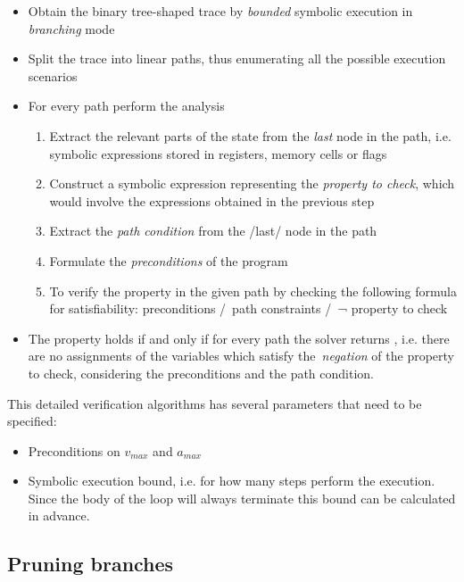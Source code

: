 \begin{itemize}
  \item Obtain the binary tree-shaped trace by \emph{bounded} symbolic execution
  in \emph{branching} mode
  \item Split the trace into linear paths, thus enumerating all the possible
    execution scenarios
  \item For every path perform the analysis
    \begin{enumerate}
      \item Extract the relevant parts of the state from the \emph{last} node in
            the path, i.e. symbolic expressions stored in
            registers, memory cells or flags
      \item Construct a symbolic expression representing the \emph{property to check},
            which would involve the expressions obtained in the previous step
      \item Extract the \emph{path condition} from the /last/ node in the path
      \item Formulate the \emph{preconditions} of the program
      \item To verify the property in the given path by checking the following
            formula for satisfiability:
              preconditions /\ path constraints /\ ¬ property to check
    \end{enumerate}
    \item  The property holds if and only if for every path the solver returns
           , i.e. there are no assignments of the variables which
           satisfy the~\emph{negation} of the property to check, considering the
           preconditions and the path condition.
\end{itemize}

This detailed verification algorithms has several parameters that need to be specified:

\begin{itemize}
\item Preconditions on $v_{max}$ and $a_{max}$
\item Symbolic execution bound, i.e. for how many steps perform the execution. Since the
      body of the loop will always terminate this bound can be calculated in advance.
\end{itemize}

\subsection{Pruning branches}

